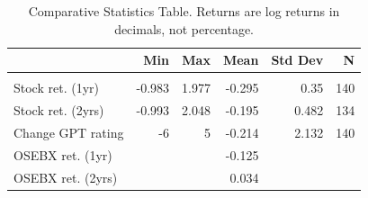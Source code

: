 \begin{table}
\caption{Comparative Statistics Table. Returns are log returns in decimals, not percentage.}
\label{table:comparative_statistics}
\begin{tabular}{lrrrrr}
\toprule
 & Min & Max & Mean & Std Dev & N \\
\midrule\addlinespace[0.4mm]\midrule
2011 &  &  &  &  &  \\
\quad Stock ret. (1yr) & -0.983 & 1.977 & -0.295 & 0.35 & 140 \\
\quad Stock ret. (2yrs) & -0.993 & 2.048 & -0.195 & 0.482 & 134 \\
\quad Change GPT rating & -6 & 5 & -0.214 & 2.132 & 140 \\
\quad OSEBX ret. (1yr) &  &  & -0.125 &  &  \\
\quad OSEBX ret. (2yrs) &  &  & 0.034 &  &  \\
\bottomrule
\end{tabular}
\end{table}

